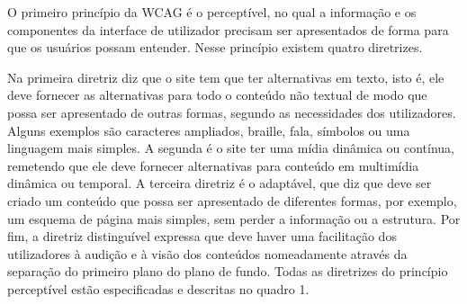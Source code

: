 \documentclass[a4paper]{article}
\begin{document}
\begin{titlepage}
O primeiro princípio da WCAG é o perceptível, no qual a informação e os componentes da interface de utilizador precisam ser apresentados de forma para que os usuários possam entender. Nesse princípio existem quatro diretrizes.

Na primeira diretriz diz que o site tem que ter alternativas em texto, isto é, ele deve fornecer as alternativas para todo o conteúdo não textual de modo que possa ser apresentado de outras formas, segundo as necessidades dos utilizadores. Alguns exemplos são caracteres ampliados, braille, fala, símbolos ou uma linguagem mais simples. A segunda é o site ter uma mídia dinâmica ou contínua, remetendo que ele deve fornecer alternativas para conteúdo em multimídia dinâmica ou temporal. A terceira diretriz é o adaptável, que diz que deve ser criado um conteúdo que possa ser apresentado de diferentes formas, por exemplo, um esquema de página mais simples, sem perder a informação ou a estrutura. Por fim, a diretriz distinguível expressa que deve haver uma facilitação dos utilizadores à audição e à visão dos conteúdos nomeadamente através da separação do primeiro plano do plano de fundo. Todas as diretrizes do princípio perceptível estão especificadas e descritas no quadro 1.\\


\end{titlepage}
\end{document}
